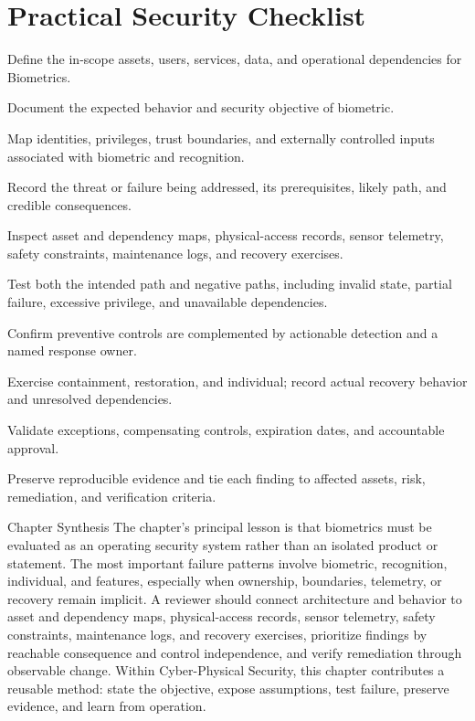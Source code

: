\documentclass[11pt,letterpaper]{article}
\begin{document}
\section*{Practical Security Checklist}
\begin{CornellChecklist}
\item Define the in-scope assets, users, services, data, and operational dependencies for Biometrics.
\item Document the expected behavior and security objective of biometric.
\item Map identities, privileges, trust boundaries, and externally controlled inputs associated with biometric and recognition.
\item Record the threat or failure being addressed, its prerequisites, likely path, and credible consequences.
\item Inspect asset and dependency maps, physical-access records, sensor telemetry, safety constraints, maintenance logs, and recovery exercises.
\item Test both the intended path and negative paths, including invalid state, partial failure, excessive privilege, and unavailable dependencies.
\item Confirm preventive controls are complemented by actionable detection and a named response owner.
\item Exercise containment, restoration, and individual; record actual recovery behavior and unresolved dependencies.
\item Validate exceptions, compensating controls, expiration dates, and accountable approval.
\item Preserve reproducible evidence and tie each finding to affected assets, risk, remediation, and verification criteria.
\end{CornellChecklist}
\begin{CornellSummaryBox}{Chapter Synthesis}
The chapter's principal lesson is that biometrics must be evaluated as an operating security system rather than an isolated product or statement. The most important failure patterns involve biometric, recognition, individual, and features, especially when ownership, boundaries, telemetry, or recovery remain implicit. A reviewer should connect architecture and behavior to asset and dependency maps, physical-access records, sensor telemetry, safety constraints, maintenance logs, and recovery exercises, prioritize findings by reachable consequence and control independence, and verify remediation through observable change. Within Cyber-Physical Security, this chapter contributes a reusable method: state the objective, expose assumptions, test failure, preserve evidence, and learn from operation.
\end{CornellSummaryBox}
\end{document}
